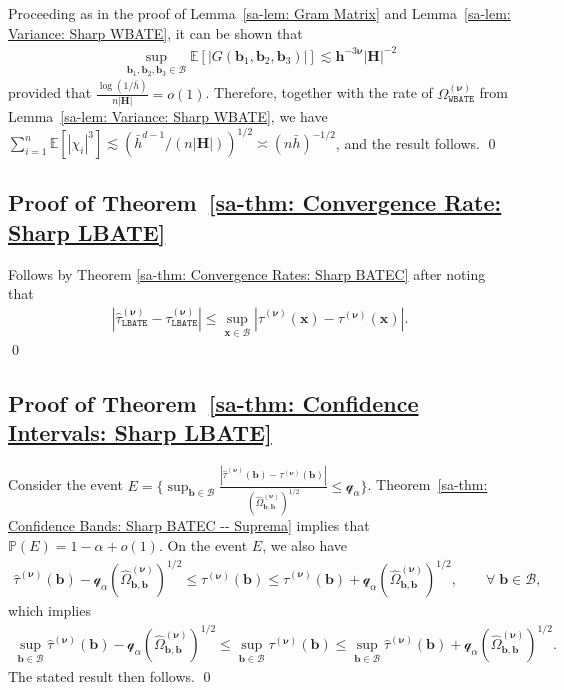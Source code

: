 \documentclass[10pt]{article}
\renewcommand{\P}{\mathbb{P}}
\newcommand{\E}{\mathbb{E}}
\newcommand{\bb}{\mathbf{b}}
\newcommand{\bh}{\mathbf{h}}
\newcommand{\bH}{\mathbf{H}}
\newcommand{\bx}{\mathbf{x}}
\newcommand{\bnu}{\boldsymbol{\nu}}
\newcommand{\B}{\mathcal{B}}
\newcommand{\q}{\mathcal{q}}
\begin{document}
Proceeding as in the proof of Lemma~\ref{sa-lem: Gram Matrix} and Lemma~\ref{sa-lem: Variance: Sharp WBATE}, it can be shown that
\begin{align*}
    \sup_{\bb_1, \bb_2, \bb_3 \in \B} \E[|G(\bb_1, \bb_2, \bb_3)|] \lesssim \bh^{-3\bnu}|\bH|^{-2}
\end{align*}
provided that $\frac{\log(1/\bar{h})}{n|\bH|} = o(1)$. Therefore, together with the rate of $\Omega_{\mathtt{WBATE}}^{(\bnu)}$ from Lemma~\ref{sa-lem: Variance: Sharp WBATE}, we have $\sum_{i = 1}^n \E[|\chi_i|^3] \lesssim (\bar{h}^{d-1}/(n|\bH|))^{1/2} \asymp (n\bar{h})^{-1/2}$, and the result follows.
\qed

\subsection{Proof of Theorem~\ref{sa-thm: Convergence Rate: Sharp LBATE}}

Follows by Theorem \ref{sa-thm: Convergence Rates: Sharp BATEC} after noting that
\begin{align*}
    |\widehat{\tau}_{\mathtt{LBATE}}^{(\bnu)} - \tau_{\mathtt{LBATE}}^{(\bnu)}|
    \leq \sup_{\bx\in\B} |\widehat{\tau}^{(\bnu)}(\bx) - \tau^{(\bnu)}(\bx)|.
\end{align*}
\qed

\subsection{Proof of Theorem~\ref{sa-thm: Confidence Intervals: Sharp LBATE}}

Consider the event $E = \Big\{\sup_{\bb \in \B} \frac{|\widehat{\tau}^{(\bnu)}(\bb) - \tau^{(\bnu)}(\bb)|}{(\widehat{\Omega}_{\bb, \bb}^{(\bnu)})^{1/2}} \leq \q_{\alpha}\Big\}$. Theorem~\ref{sa-thm: Confidence Bands: Sharp BATEC -- Suprema} implies that $\P(E) = 1 - \alpha + o(1)$. On the event $E$, we also have
\begin{align*}
    \widehat{\tau}^{(\bnu)}(\bb) - \q_{\alpha}(\widehat{\Omega}_{\bb,\bb}^{(\bnu)})^{1/2} \leq \tau^{(\bnu)}(\bb)
    \leq \widehat{\tau}^{(\bnu)}(\bb) + \q_{\alpha}(\widehat{\Omega}_{\bb,\bb}^{(\bnu)})^{1/2}, \qquad \forall \; \bb \in \B,
\end{align*}
which implies
\begin{align*}
    \sup_{\bb \in \B}  \widehat{\tau}^{(\bnu)}(\bb) - \q_{\alpha}(\widehat{\Omega}_{\bb,\bb}^{(\bnu)})^{1/2}
    \leq \sup_{\bb \in \B} \tau^{(\bnu)}(\bb)
    \leq \sup_{\bb \in \B} \widehat{\tau}^{(\bnu)}(\bb) + \q_{\alpha}(\widehat{\Omega}_{\bb,\bb}^{(\bnu)})^{1/2}.
\end{align*}
The stated result then follows.
\qed
\end{document}
